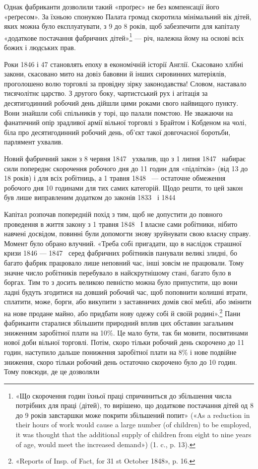 Однак фабриканти дозволили такий «проґрес» не без компенсації
його «реґресом». За їхньою спонукою Палата громад скоротила
мінімальний вік дітей, яких можна було експлуатувати,
з 9 до 8 років, щоб забезпечити для капіталу «додаткове постачання
фабричних дітей»\footnote{
«Що скорочення годин їхньої праці спричиниться до збільшення
числа потрібних для праці (дітей), то вирішено, що додаткове постачання
дітей од 8 до 9 років завстаршки може покрити збільшений
попит» («As a reduction in their hours of work would cause a large number
(of children) to be employed, it was thought that the additional supply of
children from eight to nine years of age, would meet the increased demand»)
(1. c., p. 13).
} — річ, належна йому на основі всіх
божих і людських прав.

Роки 1846 і 47 становлять епоху в економічній історії Англії.
Скасовано хлібні закони, скасовано мито на довіз бавовни й
інших сировинних матеріялів, проголошено волю торговлі за
провідну зірку законодавства! Словом, наставало тисячолітнє
царство. З другого боку, чартистський рух і агітація за десятигодинний
робочий день дійшли цими роками свого найвищого
пункту. Вони знайшли собі спільників у торі, що палали помстою.
Не зважаючи на фанатичний опір зрадливої армії вільної торговлі
з Брайтом і Кобденом на чолі, біла про десятигодинний робочий
день, об’єкт такої довгочасної боротьби, парлямент ухвалив.

Новий фабричний закон з 8 червня 1847~ ухвалив, що з
1 липня 1847~ набирає сили попереднє скорочення робочого дня
до 11 годин для «підлітків» (від 13 до 18 років) і для всіх робітниць,
а 1 травня 1848~ — остаточне обмеження робочого
дня 10 годинами для тих самих категорій. Щодо решти, то цей
закон був лише виправленим додатком до законів 1833~ і 1844~

Капітал розпочав попередній похід з тим, щоб не допустити
до повного проведення в життя закону з 1 травня 1848~ І власне
сами робітники, нібито навчені досвідом, повинні були допомогти
знову зруйнувати свою власну справу. Момент було обрано влучний.
«Треба собі пригадати, що в наслідок страшної кризи 1846 —
1847~ серед фабричних робітників панували великі злидні,
бо багато фабрик працювало лише неповний час, інші зовсім не
працювали. Тому значне число робітників перебувало в найскрутнішому
стані, багато було в боргах. Тим то з досить великою
певністю можна було припустити, що вони ладні будуть згодитися
на довший робочий час, щоб поповнити колишні втрати, сплатити,
може, борги, або викупити з заставничих домів свої меблі, або
змінити на нове продане майно, або придбати нову одежу собі й
своїй родині».\footnote{
«Reports of Insp. of Fact, for 31 st October 1848», p. 16.
} Пани фабриканти старалися збільшити природний
вплив цих обставин загальним зниженням заробітної плати
на 10\%. Це мало бути, так би мовити, посвятинами нової доби
вільної торговлі. Потім, скоро тільки робочий день скорочено
до 11 годин, наступило дальше пониження заробітної плати на
8\% і нове подвійне зниження, скоро тільки робочий день остаточно
скорочено було до 10 годин. Тому повсюди, де це дозволяли
\parbreak{}  %

